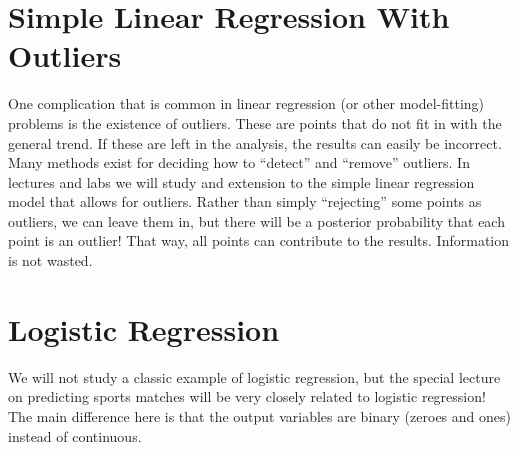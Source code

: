 \section{Simple Linear Regression With Outliers}
One complication that is common in linear regression (or other model-fitting)
problems is the existence of outliers. These are points that do not fit in with
the general trend. If these are left in the analysis, the results can easily
be incorrect. Many methods exist for deciding how to ``detect'' and ``remove''
outliers. In lectures and labs we will study and extension to the simple linear
regression model that allows for outliers. Rather than simply ``rejecting'' some
points as outliers, we can leave them in, but there will be a posterior probability
that each point is an outlier! That way, all points can contribute to the results.
Information is not wasted.

\section{Logistic Regression}
We will not study a classic example of logistic regression, but the special
lecture on predicting sports matches will be very closely related to logistic
regression! The main difference here is that the output variables are binary
(zeroes and ones) instead of continuous.
